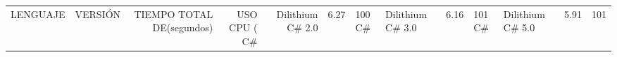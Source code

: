 \begin{tabular}{llrrr}
\toprule
LENGUAJE &          VERSIÓN & TIEMPO TOTAL DE (segundos) & USO CPU (%
\midrule
      C# & Dilithium C# 2.0 &                                  6.27 &        100%
      C# & Dilithium C# 3.0 &                                  6.16 &        101%
      C# & Dilithium C# 5.0 &                                  5.91 &        101%
\bottomrule
\end{tabular}
